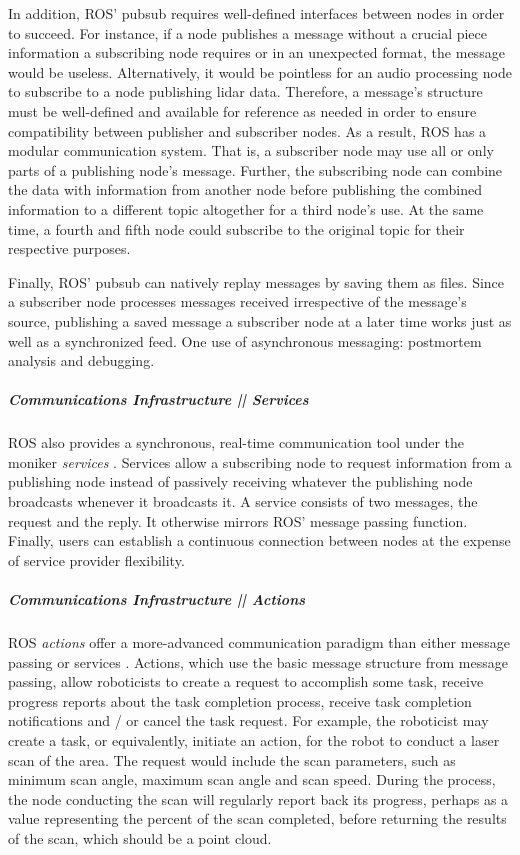 \documentclass[9pt,twocolumn,twoside]{styles/osajnl}
\begin{document}
In addition, ROS' pubsub requires well-defined interfaces between nodes in order to succeed.  For instance, if a node publishes a message without a crucial piece information a subscribing node requires or in an unexpected format, the message would be useless.  Alternatively, it would be pointless for an audio processing node to subscribe to a node publishing lidar data.  Therefore, a message's structure must be well-defined and available for reference as needed in order to ensure compatibility between publisher and subscriber nodes.  As a result, ROS has a modular communication system.  That is, a subscriber node may use all or only parts of a publishing node's message.  Further, the subscribing node can combine the data with information from another node before publishing the combined information to a different topic altogether for a third node's use.  At the same time, a fourth and fifth node could subscribe to the original topic for their respective purposes.  

Finally, ROS' pubsub can natively replay messages by saving them as files.  Since a subscriber node processes messages received irrespective of the message's source, publishing a saved message a subscriber node at a later time works just as well as a synchronized feed.  One use of asynchronous messaging: postmortem analysis and debugging.

\subparagraph{Communications Infrastructure || Services}
ROS also provides a synchronous, real-time communication tool under the moniker \textit{services} \cite{www-ros-services}. Services allow a subscribing node to request information from a publishing node instead of passively receiving whatever the publishing node broadcasts whenever it broadcasts it.  A service consists of two messages, the request and the reply.  It otherwise mirrors ROS' message passing function.  Finally, users can establish a continuous connection between nodes at the expense of service provider flexibility.

\subparagraph{Communications Infrastructure || Actions}
ROS \textit{actions} offer a more-advanced communication paradigm than either message passing or services \cite{www-ros-actionlib}.  Actions, which use the basic message structure from message passing, allow roboticists to create a request to accomplish some task, receive progress reports about the task completion process, receive task completion notifications and / or cancel the task request.  For example, the roboticist may create a task, or equivalently, initiate an action, for the robot to conduct a laser scan of the area.  The request would include the scan parameters, such as minimum scan angle, maximum scan angle and scan speed.  During the process, the node conducting the scan will regularly report back its progress, perhaps as a value representing the percent of the scan completed, before returning the results of the scan, which should be a point cloud.
\end{document}
